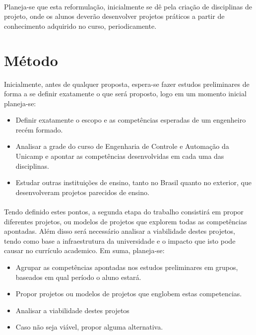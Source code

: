 \documentclass[12pt]{article} %
\begin{document}
\paragraph{}Planeja-se que esta reformulação, inicialmente se dê pela criação de disciplinas de projeto, onde os alunos deverão desenvolver projetos práticos a partir de conhecimento adquirido no curso, periodicamente.


\section{Método}

Inicialmente, antes de qualquer proposta, espera-se fazer estudos preliminares de forma a se definir exatamente o que será proposto, logo em um momento inicial planeja-se:

\begin{itemize}
\setlength\itemsep{0.01mm}
\item Definir exatamente o escopo e as competências esperadas de um engenheiro recém formado.
\item Analisar a grade do curso de Engenharia de Controle e Automação da Unicamp e apontar as competências desenvolvidas em cada uma das disciplinas.
\item Estudar outras instituições de ensino, tanto no Brasil quanto no exterior, que desenvolveram projetos parecidos de ensino.
\end{itemize}

\paragraph{} Tendo definido estes pontos, a segunda etapa do trabalho consistirá em propor diferentes projetos, ou modelos de projetos que explorem todas as competências apontadas. Além disso será necessário analisar a viabilidade destes projetos, tendo como base a infraestrutura da universidade e o impacto que isto pode causar no currículo academico. Em suma, planeja-se:

\begin{itemize}
\setlength\itemsep{0.01mm}
\item Agrupar as competências apontadas nos estudos preliminares em grupos, baseados em qual período o aluno estará.
\item Propor projetos ou modelos de projetos que englobem estas competencias.
\item Analisar a viabilidade destes projetos
\item Caso não seja viável, propor alguma alternativa.
\end{itemize}
\end{document}
